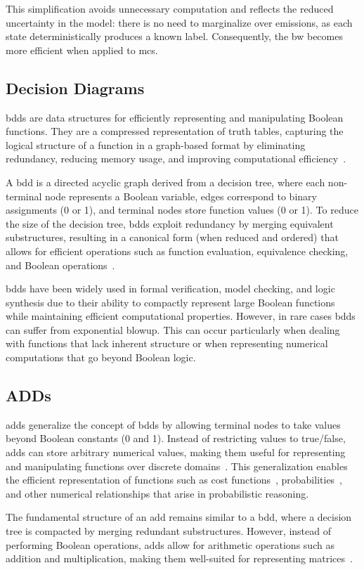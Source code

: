This simplification avoids unnecessary computation and reflects the reduced uncertainty in the model: there is no need to marginalize over emissions, as each state deterministically produces a known label.
Consequently, the \gls{bw} becomes more efficient when applied to \glspl{mc}.

\subsection{Decision Diagrams}\label{subsec:decision-diagrams}
\glspl{bdd} are data structures for efficiently representing and manipulating Boolean functions.
They are a compressed representation of truth tables, capturing the logical structure of a function in a graph-based format by eliminating redundancy, reducing memory usage, and improving computational efficiency~\cite{bryant1986graph}.

A \gls{bdd} is a directed acyclic graph derived from a decision tree, where each non-terminal node represents a Boolean variable, edges correspond to binary assignments (0 or 1), and terminal nodes store function values (0 or 1).
To reduce the size of the decision tree, \glspl{bdd} exploit redundancy by merging equivalent substructures, resulting in a canonical form (when reduced and ordered) that allows for efficient operations such as function evaluation, equivalence checking, and Boolean operations~\cite{bryant1986graph}.

\glspl{bdd} have been widely used in formal verification, model checking, and logic synthesis due to their ability to compactly represent large Boolean functions while maintaining efficient computational properties.
However, in rare cases \glspl{bdd} can suffer from exponential blowup. This can occur particularly when dealing with functions that lack inherent structure or when representing numerical computations that go beyond Boolean logic.

\subsection{ADDs}\label{subsec:adds}
\glspl{add} generalize the concept of \glspl{bdd} by allowing terminal nodes to take values beyond Boolean constants (0 and 1).
Instead of restricting values to true/false, \glspl{add} can store arbitrary numerical values, making them useful for representing and manipulating functions over discrete domains~\cite{bahar1997algebric}.
This generalization enables the efficient representation of functions such as cost functions~\cite{kwiatkowska2004probabilistic}, probabilities~\cite{baier1997symbolic}, and other numerical relationships that arise in probabilistic reasoning.

The fundamental structure of an \gls{add} remains similar to a \gls{bdd}, where a decision tree is compacted by merging redundant substructures.
However, instead of performing Boolean operations, \glspl{add} allow for arithmetic operations such as addition and multiplication, making them well-suited for representing matrices~\cite{bahar1997algebric}.